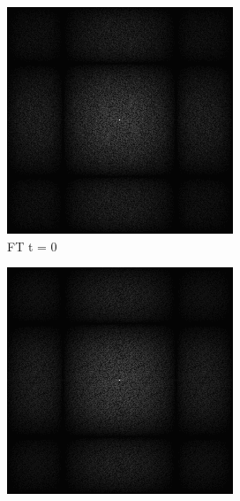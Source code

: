 \begin{figure}[H]
    \centering
    \begin{subfigure}[b]{0.2\linewidth}
      \includegraphics[width=\linewidth]{content/TemporalerAlg/Bilder/Retargeting/Bedeutung Retargeting/Sorting_Small_Block/Spektrum/Ausschnitt1.png}
       \caption{FT t = 0}
       \label{pic:sortier_t0}
    \end{subfigure}
    \begin{subfigure}[b]{0.2\linewidth}
      \includegraphics[width=\linewidth]{content/TemporalerAlg/Bilder/Retargeting/Bedeutung Retargeting/Sorting_Small_Block/Spektrum/Ausschnitt2.png}

\end{subfigure}
\end{figure}
